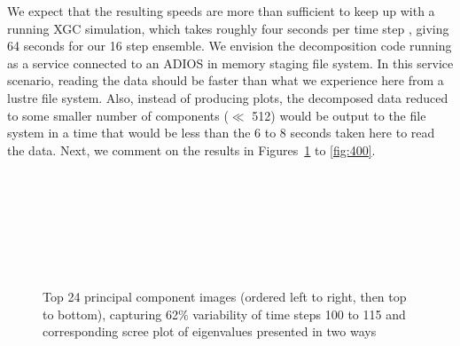 We expect that the resulting speeds are more than sufficient to keep
up with a running XGC simulation, which takes roughly four seconds per
time step \cite{XGCpertimestep}, giving 64 seconds for our 16 step
ensemble. We envision the decomposition code running as a service
connected to an ADIOS in memory staging file system. In this service
scenario, reading the data should be faster than what we experience
here from a lustre file system. Also, instead of producing plots, the
decomposed data reduced to some smaller number of components ($\ll$
512) would be output to the file system in a time that would be less
than the 6 to 8 seconds taken here to read the data. Next, we comment
on the results in Figures~\ref{fig:100} to \ref{fig:400}.
\begin{figure}[tbp]
  \begin{center}
    \\
    \\
    \\
    \\
    \\
    \\
  \end{center}
  \caption{Top 24 principal component images (ordered left to right,
    then top to bottom), capturing 62\% variability of time steps 100
    to 115 and corresponding scree plot of eigenvalues presented in
    two ways}
  \label{fig:100}
\end{figure}

